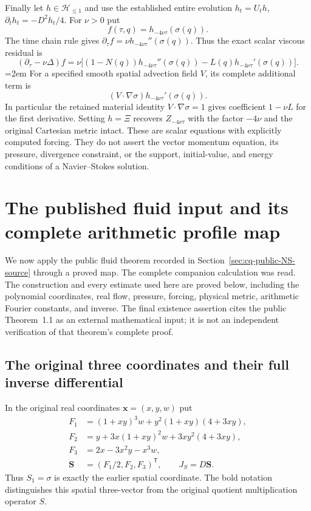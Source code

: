 Finally let $h\in\mathcal H_{\le1}$ and use the established entire
evolution $h_t=U_th$, $\partial_th_t=-D^2h_t/4$. For $\nu>0$ put
\[
 f(\tau,q)=h_{-4\nu\tau}(\sigma(q)).
\]
The time chain rule gives
$\partial_\tau f=\nu h_{-4\nu\tau}''(\sigma(q))$.
Thus the exact scalar viscous residual is
\begin{equation}
 (\partial_\tau-\nu\Delta)f
 =\nu\bigl[(1-N(q))h_{-4\nu\tau}''(\sigma(q))
          -L(q)h_{-4\nu\tau}'(\sigma(q))\bigr].
 \label{eq:cq-spatial-viscous-residual}
\end{equation}
\begingroup\emergencystretch=2em
For a specified smooth spatial advection field $V$, its complete
additional term is
\[
 (V\cdot\nabla\sigma)h_{-4\nu\tau}'(\sigma(q)).
\]
In particular the retained material identity $V\cdot\nabla\sigma=1$
gives coefficient $1-\nu L$ for the first derivative.
Setting $h=\Xi$ recovers $Z_{-4\nu\tau}$ with the factor $-4\nu$
and the original Cartesian metric intact. These are scalar equations
with explicitly computed forcing. They do not assert the vector
momentum equation, its pressure, divergence constraint, or the support,
initial-value, and energy conditions of a Navier--Stokes solution.
\par\endgroup

\section{The published fluid input and its complete arithmetic profile map}
\label{sec:cq-NS-profile-transfer}

We now apply the public fluid theorem recorded in
Section~\ref{sec:cq-public-NS-source} through a proved map.
The complete companion calculation \cite{cqNSFlow} was read.
The construction and every estimate used here are proved below,
including the polynomial coordinates, real flow, pressure,
forcing, physical metric, arithmetic Fourier constants, and inverse.
The final existence assertion cites the public Theorem~1.1 as
an external mathematical input; it is not an independent
verification of that theorem's complete proof.

\subsection{The original three coordinates and their full inverse differential}

In the original real coordinates $\mathbf x=(x,y,w)$ put
\begin{equation}
\begin{aligned}
 F_1&=(1+xy)^3w+y^2(1+xy)(4+3xy),\\
 F_2&=y+3x(1+xy)^2w+3xy^2(4+3xy),\\
 F_3&=2x-3x^2y-x^3w,\\
 \mathbf S&=(F_1/2,F_2,F_3)^{\mathsf T},\qquad J_S=D\mathbf S .
\end{aligned}
\label{eq:cq-NS-original-S}
\end{equation}
Thus $S_1=\sigma$ is exactly the earlier spatial coordinate.
The bold notation distinguishes this spatial three-vector
from the original quotient multiplication operator $S$.

